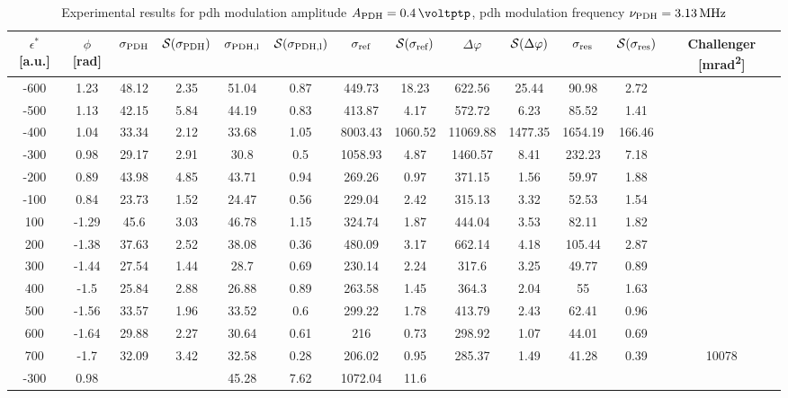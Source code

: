 \begin{landscape}
	\begin{table}
	\centering
	\begin{tabular}{|c|c|c|c|c|c|c|c|c|c|c|c|c|}
		\hline
		$\epsilon^*$ [a.u.] & $\phi$ [\si{\radian}] & $\sigma_{\text{PDH}}$ & $\mathcal{S}(\sigma_{\text{PDH}})$ & $\sigma_{\text{PDH,l}}$ & $\mathcal{S}(\sigma_{\text{PDH,l}})$  & $\sigma_{\text{ref}}$ & $\mathcal{S}(\sigma_{\text{ref}})$ & $\Delta \varphi$ & $\mathcal{S}(\Delta \varphi)$ & $\sigma_{\text{res}}$  & $\mathcal{S}(\sigma_{\text{res}})$ & Challenger [\si{\milli\radian\squared}] \\
		\hline
		\hline
		-600 & 1.23 & 48.12 & 2.35 & 51.04 & 0.87 & 449.73 & 18.23 & 622.56 & 25.44 & 90.98 & 2.72 & \\
		-500 & 1.13 & 42.15 & 5.84 & 44.19 & 0.83 & 413.87 & 4.17 & 572.72 & 6.23 & 85.52 & 1.41 & \\
		-400 & 1.04 & 33.34 & 2.12 & 33.68 & 1.05 & 8003.43 & 1060.52 & 11069.88 & 1477.35 & 1654.19 & 166.46 & \\
		-300 & 0.98 & 29.17 & 2.91 & 30.8 & 0.5 & 1058.93 & 4.87 & 1460.57 & 8.41 & 232.23 & 7.18 & \\
		-200 & 0.89 & 43.98 & 4.85 & 43.71 & 0.94 & 269.26 & 0.97 & 371.15 & 1.56 & 59.97 & 1.88 & \\
		-100 & 0.84 & 23.73 & 1.52 & 24.47 & 0.56 & 229.04 & 2.42 & 315.13 & 3.32 & 52.53 & 1.54 & \\
		100 & -1.29 & 45.6 & 3.03 & 46.78 & 1.15 & 324.74 & 1.87 & 444.04 & 3.53 & 82.11 & 1.82 & \\
		200 & -1.38 & 37.63 & 2.52 & 38.08 & 0.36 & 480.09 & 3.17 & 662.14 & 4.18 & 105.44 & 2.87 & \\
		300 & -1.44 & 27.54 & 1.44 & 28.7 & 0.69 & 230.14 & 2.24 & 317.6 & 3.25 & 49.77 & 0.89 & \\
		400 & -1.5 & 25.84 & 2.88 & 26.88 & 0.89 & 263.58 & 1.45 & 364.3 & 2.04 & 55 & 1.63 & \\
		500 & -1.56 & 33.57 & 1.96 & 33.52 & 0.6 & 299.22 & 1.78 & 413.79 & 2.43 & 62.41 & 0.96 & \\
		600 & -1.64 & 29.88 & 2.27 & 30.64 & 0.61 & 216 & 0.73 & 298.92 & 1.07 & 44.01 & 0.69 & \\
		700 & -1.7 & 32.09 & 3.42 & 32.58 & 0.28 & 206.02 & 0.95 & 285.37 & 1.49 & 41.28 & 0.39 & 10078\\
		\hline
		\hline
		-300 & 0.98 & & & 45.28 & 7.62 & 1072.04 & 11.6 & & & & & \\
		\hline
	\end{tabular}
	\caption{Experimental results for \gls{pdh} modulation amplitude $\tind{A}{PDH} = \SI{0.4}{\voltptp}$, \gls{pdh} modulation frequency $\nu_{\text{PDH}} = \SI{3.13}{\mega\hertz}$}
	\end{table}
	
\end{landscape}